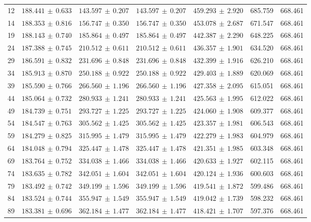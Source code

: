 {\begin{longtable}{rrrrrrr}
12 & $188.441\,\pm\,0.633$ & $143.597\,\pm\,0.207$ & $143.597\,\pm\,0.207$ & $459.293\,\pm\,2.920$ & 685.759 & 668.461\\
14 & $188.353\,\pm\,0.816$ & $156.747\,\pm\,0.350$ & $156.747\,\pm\,0.350$ & $453.078\,\pm\,2.687$ & 671.547 & 668.461\\
19 & $188.143\,\pm\,0.740$ & $185.864\,\pm\,0.497$ & $185.864\,\pm\,0.497$ & $442.387\,\pm\,2.290$ & 648.225 & 668.461\\
24 & $187.388\,\pm\,0.745$ & $210.512\,\pm\,0.611$ & $210.512\,\pm\,0.611$ & $436.357\,\pm\,1.901$ & 634.520 & 668.461\\
29 & $186.591\,\pm\,0.832$ & $231.696\,\pm\,0.848$ & $231.696\,\pm\,0.848$ & $432.399\,\pm\,1.916$ & 626.210 & 668.461\\
34 & $185.913\,\pm\,0.870$ & $250.188\,\pm\,0.922$ & $250.188\,\pm\,0.922$ & $429.403\,\pm\,1.889$ & 620.069 & 668.461\\
39 & $185.590\,\pm\,0.766$ & $266.560\,\pm\,1.196$ & $266.560\,\pm\,1.196$ & $427.358\,\pm\,2.095$ & 615.051 & 668.461\\
44 & $185.064\,\pm\,0.732$ & $280.933\,\pm\,1.241$ & $280.933\,\pm\,1.241$ & $425.563\,\pm\,1.995$ & 612.022 & 668.461\\
49 & $184.739\,\pm\,0.751$ & $293.727\,\pm\,1.225$ & $293.727\,\pm\,1.225$ & $424.060\,\pm\,1.908$ & 609.377 & 668.461\\
54 & $184.547\,\pm\,0.763$ & $305.562\,\pm\,1.425$ & $305.562\,\pm\,1.425$ & $423.357\,\pm\,1.981$ & 606.543 & 668.461\\
59 & $184.279\,\pm\,0.825$ & $315.995\,\pm\,1.479$ & $315.995\,\pm\,1.479$ & $422.279\,\pm\,1.983$ & 604.979 & 668.461\\
64 & $184.048\,\pm\,0.794$ & $325.447\,\pm\,1.478$ & $325.447\,\pm\,1.478$ & $421.351\,\pm\,1.985$ & 603.348 & 668.461\\
69 & $183.764\,\pm\,0.752$ & $334.038\,\pm\,1.466$ & $334.038\,\pm\,1.466$ & $420.633\,\pm\,1.927$ & 602.115 & 668.461\\
74 & $183.635\,\pm\,0.782$ & $342.051\,\pm\,1.604$ & $342.051\,\pm\,1.604$ & $420.124\,\pm\,1.936$ & 600.603 & 668.461\\
79 & $183.492\,\pm\,0.742$ & $349.199\,\pm\,1.596$ & $349.199\,\pm\,1.596$ & $419.541\,\pm\,1.872$ & 599.486 & 668.461\\
84 & $183.524\,\pm\,0.744$ & $355.947\,\pm\,1.549$ & $355.947\,\pm\,1.549$ & $419.042\,\pm\,1.739$ & 598.232 & 668.461\\
89 & $183.381\,\pm\,0.696$ & $362.184\,\pm\,1.477$ & $362.184\,\pm\,1.477$ & $418.421\,\pm\,1.707$ & 597.376 & 668.461\\

\end{longtable}}
